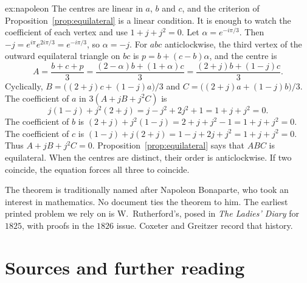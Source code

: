 \begin{solution}{ex:napoleon}
\idea The centres are linear in $a$, $b$ and $c$, and the criterion of Proposition~\ref{prop:equilateral} is a linear condition. It is enough to watch the coefficient of each vertex and use $1+j+j^2=0$.
\writeup Let $\alpha=e^{-i\pi/3}$. Then $-j=e^{i\pi}e^{2i\pi/3}=e^{-i\pi/3}$, so $\alpha=-j$. For $abc$ anticlockwise, the third vertex of the outward equilateral triangle on $bc$ is $p=b+(c-b)\alpha$, and the centre is
\[
A=\frac{b+c+p}3=\frac{(2-\alpha)b+(1+\alpha)c}3=\frac{(2+j)b+(1-j)c}3.
\]
Cyclically, $B=\bigl((2+j)c+(1-j)a\bigr)/3$ and $C=\bigl((2+j)a+(1-j)b\bigr)/3$. The coefficient of $a$ in $3(A+jB+j^2C)$ is
\[
j(1-j)+j^2(2+j)=j-j^2+2j^2+1=1+j+j^2=0.
\]
The coefficient of $b$ is $(2+j)+j^2(1-j)=2+j+j^2-1=1+j+j^2=0$. The coefficient of $c$ is $(1-j)+j(2+j)=1-j+2j+j^2=1+j+j^2=0$. Thus $A+jB+j^2C=0$. Proposition~\ref{prop:equilateral} says that $ABC$ is equilateral. When the centres are distinct, their order is anticlockwise. If two coincide, the equation forces all three to coincide.

The theorem is traditionally named after Napoleon Bonaparte, who took an interest in mathematics. No document ties the theorem to him. The earliest printed problem we rely on is W.~Rutherford's, posed in \emph{The Ladies' Diary} for $1825$, with proofs in the $1826$ issue. Coxeter and Greitzer record that history.
\end{solution}

\section*{Sources and further reading}

